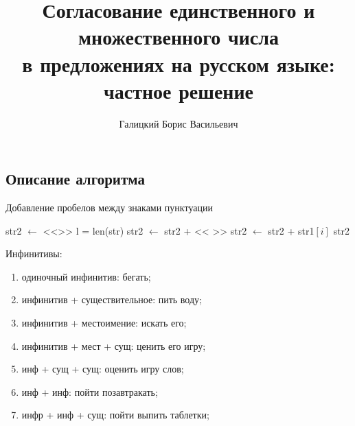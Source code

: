 \documentclass[a4paper,12pt]{article} %
\title{Согласование единственного и множественного числа\\ в предложениях на русском языке: частное решение}
\author{Галицкий Борис Васильевич}
\theoremstyle{definition}
\theoremstyle{plain}
\begin{document}
\maketitle

\subsection*{Описание алгоритма}



\begin{algorithm}
\caption{Добавление пробелов между знаками пунктуации}
\begin{algorithmic}[1]
\State str2 $\gets $ <<>> 
\State l = len(str)
\State str2 $\gets$ str2 + << >>
\EndIf
\State str2 $\gets$ str2 + str1$[i]$
\EndFor
\State\Return str2
\EndFunction
\end{algorithmic}
\end{algorithm}
Инфинитивы:
\begin{enumerate}
	\item одиночный инфинитив: бегать;
	\item инфинитив + существительное: пить воду;
	\item инфинитив + местоимение: искать его;
	\item инфинитив + мест + сущ: ценить его игру;
	\item инф + сущ + сущ: оценить игру слов;
	\item инф + инф: пойти позавтракать;
	\item инфр + инф + сущ: пойти выпить таблетки;
\end{enumerate}
\end{document}
